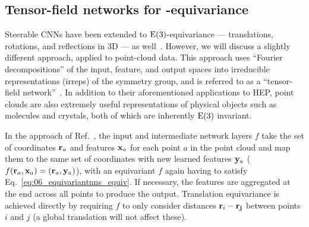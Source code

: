 \subsection{Tensor-field networks for \texorpdfstring{\EE[3]}{E(3)}-equivariance}
\label{sec:06_equivariantnns_e3}

Steerable CNNs have been extended to $\EE[3]$-equivariance --- translations, rotations, and reflections in 3D --- as well~\cite{weiler20183d}. 
However, we will discuss a slightly different approach, applied to point-cloud data.
This approach uses ``Fourier decompositions'' of the input, feature, and output spaces into irreducible representations (irreps) of the symmetry group, and is referred to as a ``tensor-field network''~\cite{thomas2018tensor}. 
In addition to their aforementioned applications to HEP, point clouds are also extremely useful representations of physical objects such as molecules and crystals, both of which are inherently $\EE[3]$ invariant.

In the approach of Ref.~\cite{thomas2018tensor}, the input and intermediate network layers $f$ take the set of coordinates $\mathbf{r}_a$ and features $\mathbf{x}_a$ for each point $a$ in the point cloud and map them to the same set of coordinates with new learned features $\mathbf{y}_a$ ($f(\mathbf{r}_a,\mathbf{x}_a) = (\mathbf{r}_a,\mathbf{y}_a)$), with an equivariant $f$ again having to satisfy Eq.~\ref{eq:06_equivariantnns_equiv}.
If necessary, the features are aggregated at the end across all points to produce the output.
Translation equivariance is achieved directly by requiring $f$ to only consider distances $\mathbf{r}_i - \mathbf{r_j}$ between points $i$ and $j$ (a global translation will not affect these). 

